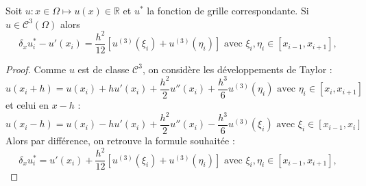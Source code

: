 \begin{proposition}
Soit $u: x \in \Omega \mapsto u(x) \in \mathbb{R}$ et $u^*$ la fonction de grille correspondante. Si $u \in \mathcal{C}^3 (\Omega)$ alors 
\begin{equation}
\delta_x u^*_i - u'(x_i) = \dfrac{h^2}{12} \left[ u^{(3)}(\xi_i) + u^{(3)}(\eta_i) \right]  \text{ avec } \xi_i , \eta_i \in [x_{i-1}, x_{i+1}],
\end{equation}
\end{proposition}

\begin{proof}
Comme $u$ est de classe $\mathcal{C}^3$, on considère les développements de Taylor :
\begin{equation}
u(x_i+h) = u(x_i) + h u'(x_i) + \dfrac{h^2}{2} u''(x_i) + \dfrac{h^3}{6} u^{(3)} (\eta_i) \text{ avec } \eta_i \in [x_i, x_{i+1}]
\end{equation}
et celui en $x-h$ :
\begin{equation}
u(x_i-h) = u(x_i) - h u'(x_i) + \dfrac{h^2}{2} u''(x_i) - \dfrac{h^3}{6}u^{(3)}(\xi_i) \text{ avec } \xi_i \in [x_{i-1}, x_{i}]
\end{equation}
Alors par différence, on retrouve la formule souhaitée : 
\begin{equation}
\delta_x u^*_i = u'(x_i) + \dfrac{h^2}{12} \left[ u^{(3)}(\xi_i) + u^{(3)}(\eta_i) \right]  \text{ avec } \xi_i, \eta_i \in [x_{i-1}, x_{i+1}],
\end{equation}
\end{proof}

